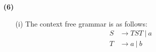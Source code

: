 \documentclass [10pt]{article}
\begin{document}
\begin{enumerate}
\begin{enumerate}
		\end{enumerate}
	\item[\textbf{(6)}]
		\begin{enumerate}
			\item[(i)]The context free grammar is as follows:
			\begin{align}
				S &\rightarrow TST\:|\:a \nonumber \\
				T &\rightarrow a\:|\:b \nonumber
			\end{align}
		\end{enumerate}
\end{enumerate}
\end{document}
